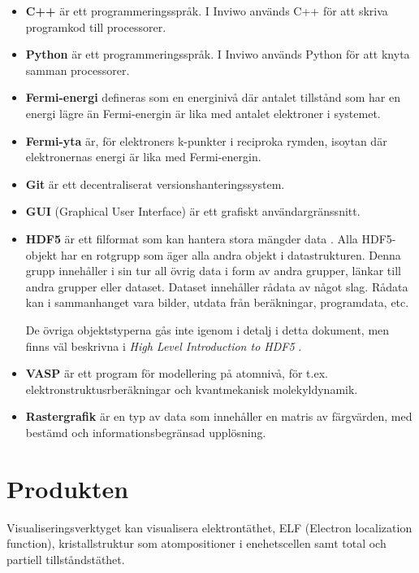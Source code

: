 \documentclass[a4paper,12pt]{article}
\begin{document}
\begin{itemize}
\item \textbf{C++} är ett programmeringsspråk.
	\cite{C++}
	\newline
	I Inviwo används C++ för att skriva programkod till processorer.

\item \textbf{Python} är ett programmeringsspråk.
	\cite{Python}
	\newline
	I Inviwo används Python för att knyta samman processorer.

\item \textbf{Fermi-energi} defineras som en energinivå där antalet tillstånd som har en energi lägre än Fermi-energin är lika med antalet elektroner i systemet. \cite{Fermi-energi}

\item \textbf{Fermi-yta} är, för elektroners k-punkter i reciproka rymden, isoytan där elektronernas energi är lika med Fermi-energin.
\cite{Fermi-yta}

\item \textbf{Git} är ett decentraliserat versionshanteringssystem.
\cite{Git}
    
\item \textbf{GUI} (Graphical User Interface) är ett grafiskt
användargränssnitt.
\cite{GUI}

\item \textbf{HDF5} är ett filformat som kan hantera stora mängder data \cite{hdf5}. Alla HDF5-objekt har en rotgrupp som äger alla andra objekt i datastrukturen. Denna grupp innehåller i sin tur all övrig data i form av andra grupper, länkar till andra grupper eller dataset. Dataset innehåller rådata av något slag. Rådata kan i sammanhanget vara bilder, utdata från beräkningar, programdata, etc. \cites[4-5]{hdf5-intro}

De övriga objektstyperna gås inte igenom i detalj i detta dokument,
men finns väl beskrivna i \emph{High Level Introduction to HDF5} \cite{hdf5-intro}.

\item \textbf{VASP} är ett program för modellering på atomnivå, för t.ex. elektronstruktusrberäkningar och kvantmekanisk molekyldynamik.
\cite{VASP}

\item \textbf{Rastergrafik} är en typ av data som innehåller en matris av färgvärden, med bestämd och informationsbegränsad upplösning.
\cite{raster}

\end{itemize}

\section{Produkten}
Visualiseringsverktyget kan visualisera elektrontäthet, ELF (Electron localization function), kristallstruktur som atompositioner i enehetscellen samt total och partiell tillståndstäthet.
\end{document}
